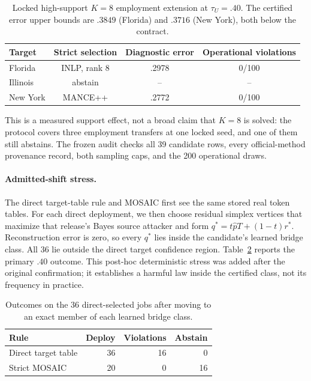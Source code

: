 \begin{table}[t]
\centering
\scriptsize
\setlength{\tabcolsep}{3.0pt}
\begin{tabular}{lccc}
\hline
Target & Strict selection & Diagnostic error & Operational violations \\
\hline
Florida & INLP, rank 8 & .2978 & 0/100 \\
Illinois & abstain & -- & -- \\
New York & MANCE++ & .2772 & 0/100 \\
\hline
\end{tabular}
\caption{Locked high-support $K=8$ employment extension at
$\tau_U=.40$. The certified error upper bounds are $.3849$ (Florida) and
$.3716$ (New York), both below the contract.}
\label{supp:tab:k8-high-support}
\end{table}

This is a measured support effect, not a broad claim that $K=8$ is solved:
the protocol covers three employment transfers at one locked seed, and one of
them still abstains. The frozen audit checks all 39 candidate rows, every
official-method provenance record, both sampling caps, and the 200 operational
draws.

\paragraph{Admitted-shift stress.}
The direct target-table rule and MOSAIC first see the same stored real token
tables. For each direct deployment, we then choose residual simplex vertices
that maximize that release's Bayes source attacker and form
$q^*=t\widehat pT+(1-t)r^*$. Reconstruction error is zero, so every $q^*$ lies
inside the candidate's learned bridge class. All 36 lie outside the direct
target confidence region. Table~\ref{supp:tab:admitted-shift} reports the
primary $.40$ outcome. This post-hoc deterministic stress was added after the
original
confirmation; it establishes a harmful law inside the certified class, not its
frequency in practice.

\begin{table}[t]
\centering
\small
\setlength{\tabcolsep}{3.4pt}
\begin{tabular}{lrrr}
\hline
Rule & Deploy & Violations & Abstain \\
\hline
Direct target table & 36 & 16 & 0 \\
Strict MOSAIC & 20 & 0 & 16 \\
\hline
\end{tabular}
\caption{Outcomes on the 36 direct-selected jobs after moving to an exact
member of each learned bridge class.}
\label{supp:tab:admitted-shift}
\end{table}

